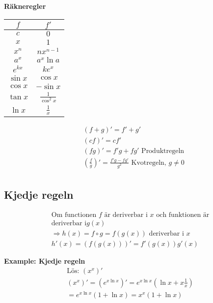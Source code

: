 \begin{multicols}{2}
\textbf{Räkneregler}
\begin{center}
\begin{tabular}{ |c|c| } 
 \hline
 $f$       & $f'$         \\
 \hline
 $c$       & $0$          \\
 $x$       & $1$          \\ 
 $x^n$     & $nx^{n-1}$    \\  
 $a^x$     & $a^x\ln{a}$   \\ 
 $e^{kx}$  & $ke^{x}$       \\
 $\sin{x}$ & $\cos{x}$     \\
 $\cos{x}$ & $-\sin{x}$    \\
 $\tan{x}$ & $\frac{1}{\cos^2{x}}$    \\
 $\ln{x}$  & $\frac{1}{x}$ \\
 \hline
\end{tabular}
\end{center}

\begin{align*}
  &\quad  (f+g)' = f' + g' \\
  &\quad  (cf)'  = cf' \\
  &\quad  (fg)'  = f'g + fg' \text{ Produktregeln} \\
  &\quad  \left( \frac{f}{g} \right)' = \frac{f'g - fg'}{g^2} \text{ Kvotregeln, } g \neq 0 \\
\end{align*}


\subsection{Kjedje regeln}
\begin{align*}
  &\text{Om functionen $f$ är deriverbar i $x$ och funktionen är} \\
  &\text{deriverbar i} g(x) \\
  &\Rightarrow h(x)=f \circ g = f(g(x)) \text{ deriverbar i } x \\
  &h'(x)=(f(g(x)))'=f'(g(x))g'(x)
\end{align*}

  \textbf{Example: Kjedje regeln}
  \begin{align*}
    &\text{Lös: } (x^x)'  \\
    &(x^x)'=\left( e^{x\ln{x}} \right)'=e^{x\ln{x}} \left( \ln{x}+x\frac{1}{x} \right) \\
    &= e^{x\ln{x}}(1+\ln{x})=x^x(1+\ln{x}) \\
  \end{align*}



\end{multicols}
